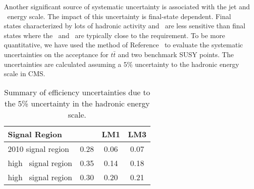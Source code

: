 Another significant source of systematic uncertainty is 
associated with the jet and \met\ energy scale.  The impact
of this uncertainty is final-state dependent.  Final
states characterized by lots of hadronic activity and \met\ are 
less sensitive than final states where the \met\ and \Ht\
are typically close to the requirement.  To be more quantitative,
we have used the method of Reference~\cite{ref:top} to evaluate
the systematic uncertainties on the acceptance for $t\bar{t}$ 
and two benchmark SUSY points.  The uncertainties are calculated
assuming a 5\% uncertainty to the hadronic energy scale in CMS.

\begin{table}[hbt]
\begin{center}
\caption{\label{tab:jetmet} 
Summary of efficiency uncertainties due to the 5\% uncertainty in the hadronic energy scale.
}
\begin{tabular}{l|ccc}
\hline
Signal Region             & \ttbar  &   LM1   &   LM3    \\
\hline
2010 signal region        &  0.28   &  0.06   &  0.07    \\
high \met\ signal region  &  0.35   &  0.14   &  0.18    \\ 
high \Ht\ signal region   &  0.30   &  0.20   &  0.21    \\
\hline
\end{tabular}
\end{center}
\end{table}

